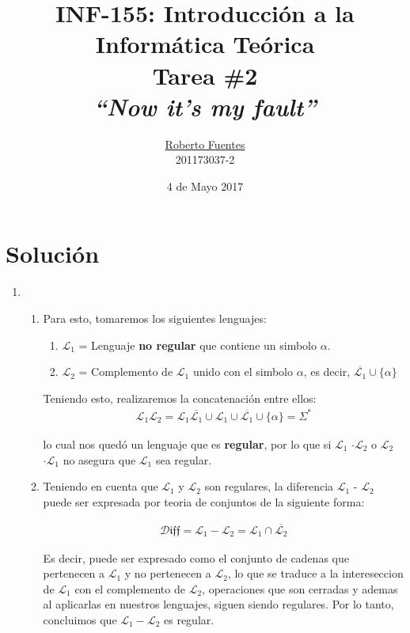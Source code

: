 \documentclass[spanish, fleqn]{article}
\title{INF-155: Introducción a la Informática Teórica\\
       [0.4\baselineskip]
       Tarea \#2 \\
       \emph{``Now it’s my fault''}
      }
\author{\href{mailto:roberto.fuentes@alumnos.usm.cl}{Roberto Fuentes}\\
201173037-2}
\date{4 de Mayo 2017}
\begin{document}
\maketitle

\thispagestyle{empty}

\section*{Solución}
    
    \begin{enumerate}

        \item 
        \begin{enumerate}
            \item Para esto, tomaremos los siguientes lenguajes:
            \begin{enumerate}
                \item $\mathcal{L}_1$ = Lenguaje \textbf{no regular} que contiene un simbolo $\alpha$. 
                \item $\mathcal{L}_2$ = Complemento de $\mathcal{L}_1$ unido con el simbolo $\alpha$, es decir, $\overline{\mathcal{L}_1} \cup \{\alpha\}$
            \end{enumerate}
            
            Teniendo esto, realizaremos la concatenación entre ellos:
            \begin{align*}
                \mathcal{L}_1 \mathcal{L}_2 = \mathcal{L}_1 \overline{\mathcal{L}_1} \cup \mathcal{L}_1 \cup \overline{\mathcal{L}_1} \cup \{\alpha\} = \Sigma^*
            \end{align*}
            
            lo cual nos quedó un lenguaje que es \textbf{regular}, por lo que si $\mathcal{L}_1$ $\cdot \mathcal{L}_2$ o $\mathcal{L}_2$ $\cdot \mathcal{L}_1$ no asegura que $\mathcal{L}_1$ sea regular.
            \item Teniendo en cuenta que $\mathcal{L}_1$ y 	$\mathcal{L}_2$ son regulares, la diferencia $\mathcal{L}_1$ - 	$\mathcal{L}_2$ puede ser expresada por teoria de conjuntos de la siguiente forma:
            
            \begin{align*}
                \mathcal{D} \mathfrak{i f f} = \mathcal{L}_1 - \mathcal{L}_2 = \mathcal{L}_1 \cap \overline{\mathcal{L}_2} 
            \end{align*}
            
            Es decir, puede ser expresado como el conjunto de cadenas que pertenecen a $\mathcal{L}_1$ y no pertenecen a $\mathcal{L}_2$, lo que se traduce a la intereseccion de $\mathcal{L}_1$ con el complemento de $\mathcal{L}_2$, operaciones que son cerradas y ademas al aplicarlas en nuestros lenguajes, siguen siendo regulares. Por lo tanto, concluimos que $\mathcal{L}_1 - \mathcal{L}_2$ es regular.
            

\end{enumerate}
\end{enumerate}
\end{document}
